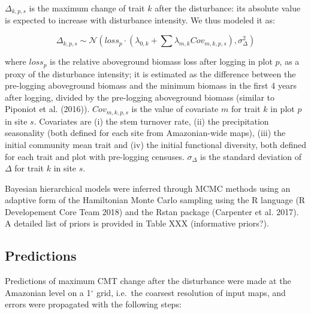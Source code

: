 \documentclass[]{elsarticle} %
\begin{document}
\(\Delta_{k,p,s}\) is the maximum change of trait \(k\) after the
disturbance: its absolute value is expected to increase with disturbance
intensity. We thus modeled it as:

\begin{equation} 
\Delta_{k,p,s} \sim \mathcal{N} \left( loss_p \cdot (\lambda_{0,k} + \sum \lambda_{m,k} Cov_{m,k,p,s} )  , \sigma_{\Delta}^2 \right)
\end{equation}

where \(loss_p\) is the relative aboveground biomass loss after logging
in plot \(p\), as a proxy of the disturbance intensity; it is estimated
as the difference between the pre-logging aboveground biomass and the
minimum biomass in the first 4 years after logging, divided by the
pre-logging aboveground biomass (similar to Piponiot et al. (2016)).
\(Cov_{m,k,p,s}\) is the value of covariate \(m\) for trait \(k\) in
plot \(p\) in site \(s\). Covariates are (i) the stem turnover rate,
(ii) the precipitation seasonality (both defined for each site from
Amazonian-wide maps), (iii) the initial community mean trait and (iv)
the initial functional diversity, both defined for each trait and plot
with pre-logging censuses. \(\sigma_{\Delta}\) is the standard deviation
of \(\Delta\) for trait \(k\) in site \(s\).

Bayesian hierarchical models were inferred through MCMC methods using an
adaptive form of the Hamiltonian Monte Carlo sampling using the R
language (R Developement Core Team 2018) and the Rstan package
(Carpenter et al. 2017). A detailed list of priors is provided in Table
XXX (informative priors?).

\subsection{Predictions}\label{predictions}

Predictions of maximum CMT change after the disturbance were made at the
Amazonian level on a 1\(^\circ\) grid, i.e.~the coarsest resolution of
input maps, and errors were propagated with the following steps:
\end{document}

